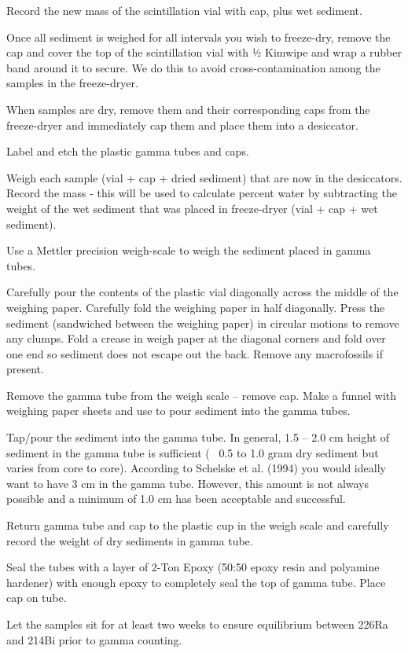 \documentclass[12pt]{../SOP3}\usepackage[]{graphicx}\usepackage[]{color}
\begin{document}
\NP Record the new mass of the scintillation vial with cap, plus wet sediment. 

\NP Once all sediment is weighed for all intervals you wish to freeze-dry, remove the cap and cover the top of the scintillation vial with 1⁄2 Kimwipe and wrap a rubber band around it to secure. We do this to avoid cross-contamination among the samples in the freeze-dryer. 

\NP When samples are dry, remove them and their corresponding caps from the freeze-dryer and immediately cap them and place them into a desiccator. 

\NP Label and etch the plastic gamma tubes and caps. 

\NP Weigh each sample (vial + cap + dried sediment) that are now in the desiccators. Record the mass - this will be used to calculate percent water by subtracting the weight of the wet sediment that was placed in freeze-dryer (vial + cap + wet sediment).

\NP Use a Mettler precision weigh-scale to weigh the sediment placed in gamma tubes. 

\NP Carefully pour the contents of the plastic vial diagonally across the middle of the weighing paper. Carefully fold the weighing paper in half diagonally. Press the sediment (sandwiched between the weighing paper) in circular motions to remove any clumps. Fold a crease in weigh paper at the diagonal corners and fold over one end so sediment does not escape out the back.  Remove any macrofossils if present. 

\NP Remove the gamma tube from the weigh scale – remove cap. Make a funnel with weighing paper sheets and use to pour sediment into the gamma tubes.

\NP Tap/pour the sediment into the gamma tube. In general, 1.5 – 2.0 cm height of sediment in the gamma tube is sufficient (~ 0.5 to 1.0 gram dry sediment but varies from core to core). According to Schelske et al. (1994) you would ideally want to have 3 cm in the gamma tube. However, this amount is not always possible and a minimum of 1.0 cm has been acceptable and successful. 

\NP Return gamma tube and cap to the plastic cup in the weigh scale and carefully record the weight of dry sediments in gamma tube.

\NP Seal the tubes with a layer of 2-Ton Epoxy (50:50 epoxy resin and polyamine hardener) with enough epoxy to completely seal the top of gamma tube. Place cap on tube. 

\NP Let the samples sit for at least two weeks to ensure equilibrium between 226Ra and 214Bi prior to gamma counting. 
\end{document}
